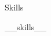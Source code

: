 \fontsize{7mm}{8mm}\selectfont
\color{highlightcolor}
Skills

\fontsize{3mm}{4mm}\selectfont
\color{black}
\begin{multicols}{2}
__skills__
\end{multicols}